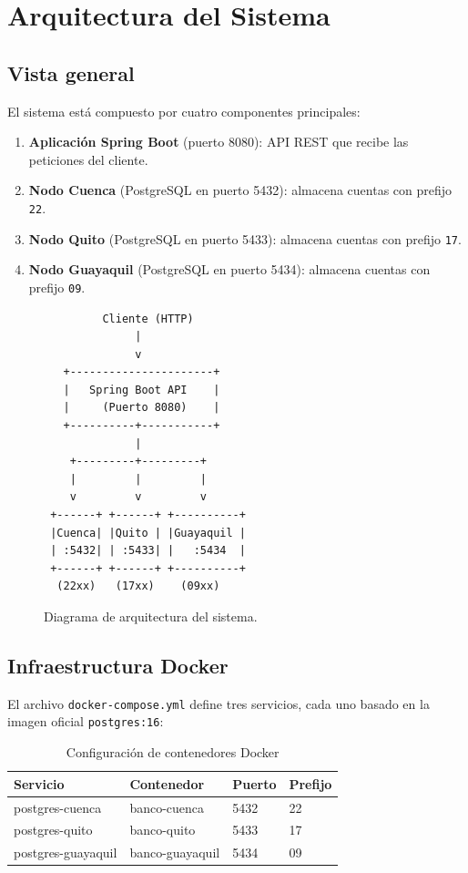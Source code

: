 \documentclass[12pt, a4paper]{article}
\begin{document}
\section{Arquitectura del Sistema}

\subsection{Vista general}

El sistema está compuesto por cuatro componentes principales:

\begin{enumerate}
  \item \textbf{Aplicación Spring Boot} (puerto 8080): API REST que recibe las peticiones del cliente.
  \item \textbf{Nodo Cuenca} (PostgreSQL en puerto 5432): almacena cuentas con prefijo \texttt{22}.
  \item \textbf{Nodo Quito} (PostgreSQL en puerto 5433): almacena cuentas con prefijo \texttt{17}.
  \item \textbf{Nodo Guayaquil} (PostgreSQL en puerto 5434): almacena cuentas con prefijo \texttt{09}.
\end{enumerate}

\begin{figure}[H]
\centering
\begin{mdframed}[backgroundcolor=grisClaro, linewidth=1pt]
\begin{verbatim}
         Cliente (HTTP)
              |
              v
   +----------------------+
   |   Spring Boot API    |
   |     (Puerto 8080)    |
   +----------+-----------+
              |
    +---------+---------+
    |         |         |
    v         v         v
 +------+ +------+ +----------+
 |Cuenca| |Quito | |Guayaquil |
 | :5432| | :5433| |   :5434  |
 +------+ +------+ +----------+
  (22xx)   (17xx)    (09xx)
\end{verbatim}
\end{mdframed}
\caption{Diagrama de arquitectura del sistema.}
\end{figure}

\subsection{Infraestructura Docker}
El archivo \texttt{docker-compose.yml} define tres servicios, cada uno basado en la imagen oficial \texttt{postgres:16}:

\begin{table}[H]
\centering
\caption{Configuración de contenedores Docker}
\begin{tabular}{@{} l l l l @{}}
\toprule
\textbf{Servicio} & \textbf{Contenedor} & \textbf{Puerto} & \textbf{Prefijo} \\
\midrule
postgres-cuenca & banco-cuenca & 5432 & 22 \\
postgres-quito & banco-quito & 5433 & 17 \\
postgres-guayaquil & banco-guayaquil & 5434 & 09 \\
\bottomrule
\end{tabular}
\end{table}
\end{document}

